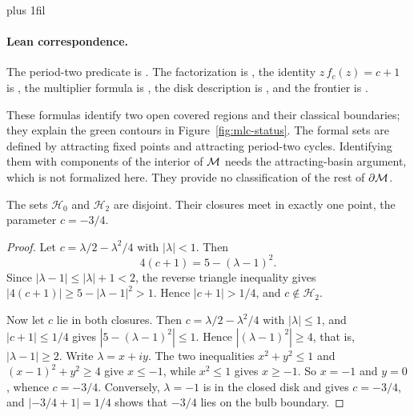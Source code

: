 {\rightskip=0pt plus 1fil
\paragraph{Lean correspondence.}
The period-two predicate is
.
The factorization is
,
the identity $z\,f_c(z)=c+1$ is
,
the multiplier formula is
,
the disk description is
,
and the frontier is
.\par}

These formulas identify two open covered regions and their classical
boundaries; they explain the green contours in Figure~\ref{fig:mlc-status}.
The formal sets are defined by attracting fixed points and attracting
period-two cycles.  Identifying them with components of the interior of
$\mathcal M$ needs the attracting-basin argument, which is not formalized here.
They provide no classification of the rest of $\partial\mathcal M$.

\begin{proposition}
\label{prop:cardioid-bulb-contact}
The sets $\mathcal H_0$ and $\mathcal H_2$ are disjoint.  Their closures meet
in exactly one point, the parameter $c=-3/4$.
\end{proposition}

\begin{proof}
Let $c=\lambda/2-\lambda^2/4$ with $|\lambda|<1$.  Then
\[
 4(c+1)=5-(\lambda-1)^2.
\]
Since $|\lambda-1|\le|\lambda|+1<2$, the reverse triangle inequality gives
$|4(c+1)|\ge5-|\lambda-1|^2>1$.  Hence $|c+1|>1/4$, and $c\notin\mathcal H_2$.

Now let $c$ lie in both closures.  Then $c=\lambda/2-\lambda^2/4$ with
$|\lambda|\le1$, and $|c+1|\le1/4$ gives $|5-(\lambda-1)^2|\le1$.  Hence
$|(\lambda-1)^2|\ge4$, that is, $|\lambda-1|\ge2$.  Write $\lambda=x+iy$.  The
two inequalities $x^2+y^2\le1$ and $(x-1)^2+y^2\ge4$ give $x\le-1$, while
$x^2\le1$ gives $x\ge-1$.  So $x=-1$ and $y=0$, whence $c=-3/4$.
Conversely, $\lambda=-1$ is in the closed disk and gives $c=-3/4$, and
$|-3/4+1|=1/4$ shows that $-3/4$ lies on the bulb boundary.
\end{proof}

